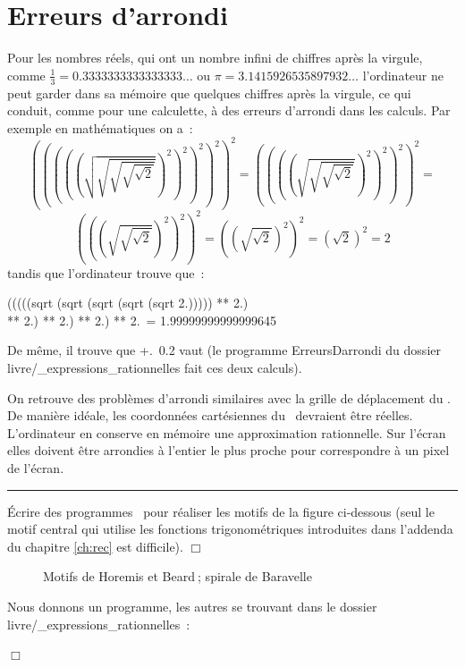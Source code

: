 \section{Erreurs d'arrondi}
Pour les nombres réels, qui ont un nombre infini de chiffres après la virgule, comme
$\frac{1}{3} = 0.3333333333333333\ldots$ ou $\pi = 3.1415926535897932\ldots$
l'ordinateur ne peut garder dans sa mémoire que quelques chiffres après la virgule, ce
qui conduit, comme pour une calculette, à des erreurs d'arrondi dans les calculs. Par
exemple en ma\-thé\-ma\-ti\-ques on a~:
\[\left(\left(\left(\left(\left(\sqrt{\sqrt{\sqrt{\sqrt{\sqrt{2}}}}}\right)^{2}\right)^{2}\right)^{2}\right)^{2}\right)^{2} =
\left(\left(\left(\left(\sqrt{\sqrt{\sqrt{\sqrt{2}}}}\right)^{2}\right)^{2}\right)^{2}\right)^{2} =
\] \[\left(\left(\left(\sqrt{\sqrt{\sqrt{2}}}\right)^{2}\right)^{2}\right)^{2} =
\left(\left(\sqrt{\sqrt{2}}\right)^{2}\right)^{2} =
\left(\sqrt{2}\right)^{2} =
2\]
tandis que l'ordinateur trouve  que~:
\begin{center}
{\idt (((((sqrt (sqrt (sqrt (sqrt (sqrt 2.))))) ** 2.)\hspace*{6em}}\\
{\idt \hspace*{6em}** 2.) ** 2.) ** 2.) ** 2.\ = 1.99999999999999645}
\end{center}

\noindent De même, il trouve que { +.\ 0.2} vaut
{} (le programme {\idt ErreursDarrondi} du dossier
{\idt livre/\_expressions\_rationnelles} fait ces deux calculs).

\noindent  On retrouve des problèmes d'arrondi similaires avec la grille de dé\-pla\-ce\-ment du \robot. De
manière idéale, les coordonnées cartésiennes du \robot\ devraient être réelles.
L'ordinateur en conserve en mémoire une approximation rationnelle. Sur l'écran elles doivent
être arrondies à l'entier le plus proche pour correspondre à un pixel de l'écran.

\noindent \rule{137mm}{0.1mm} %
\begin{exercice}{Écrire des programmes \ocaml\  pour réaliser les motifs de la figure
ci-dessous (seul le motif central qui utilise les fonc\-tions tri\-go\-no\-mé\-tri\-ques in\-tro\-dui\-tes
dans l'addenda du chapitre \ref{ch:rec}  est difficile).
\noindent $\Box$}\end{exercice}
\begin{figure}[htbp]
 \caption{Motifs de Horemis et Beard$\:$; spirale de Baravelle}\label{fig:beard}
\end{figure}
\vfill
\begin{corrige}{
Nous donnons un programme, les autres se trouvant dans le dossier
{\idt livre/\_expressions\_rationnelles}~:
\label{prog:CarresImbriquesPeints}

\noindent $\Box$}\end{corrige}

